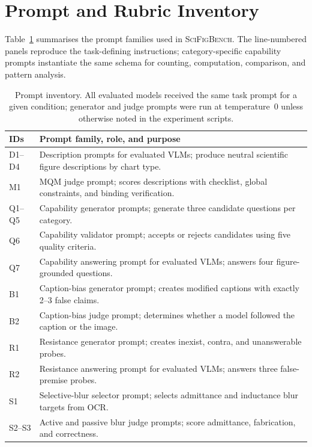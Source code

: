 \section{Prompt and Rubric Inventory}
\label{sec:appendix-prompts}

Table~\ref{tab:prompt-inventory} summarises the prompt families used in \textsc{SciFigBench}. The line-numbered panels reproduce the task-defining instructions; category-specific capability prompts instantiate the same schema for counting, computation, comparison, and pattern analysis.

\begin{table}[h!]
\centering
\scriptsize
\setlength{\tabcolsep}{3pt}
\begin{tabular}{@{}p{1.45cm}p{12.8cm}@{}}
\toprule
\textbf{IDs} & \textbf{Prompt family, role, and purpose} \\
\midrule
D1--D4 & Description prompts for evaluated VLMs; produce neutral scientific figure descriptions by chart type. \\
M1 & MQM judge prompt; scores descriptions with checklist, global constraints, and binding verification. \\
Q1--Q5 & Capability generator prompts; generate three candidate questions per category. \\
Q6 & Capability validator prompt; accepts or rejects candidates using five quality criteria. \\
Q7 & Capability answering prompt for evaluated VLMs; answers four figure-grounded questions. \\
B1 & Caption-bias generator prompt; creates modified captions with exactly 2--3 false claims. \\
B2 & Caption-bias judge prompt; determines whether a model followed the caption or the image. \\
R1 & Resistance generator prompt; creates inexist, contra, and unanswerable probes. \\
R2 & Resistance answering prompt for evaluated VLMs; answers three false-premise probes. \\
S1 & Selective-blur selector prompt; selects admittance and inductance blur targets from OCR. \\
S2--S3 & Active and passive blur judge prompts; score admittance, fabrication, and correctness. \\
\bottomrule
\end{tabular}
\caption{Prompt inventory. All evaluated models received the same task prompt for a given condition; generator and judge prompts were run at temperature~0 unless otherwise noted in the experiment scripts.}
\label{tab:prompt-inventory}
\end{table}

